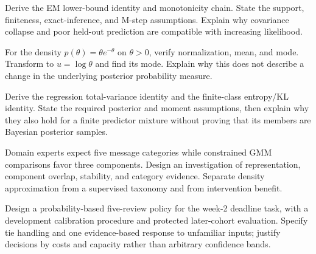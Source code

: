 \par\noindent\begin{minipage}{\linewidth}
\begin{challengeexercises}
\item {}Derive the EM lower-bound identity and monotonicity chain. State the support, finiteness, exact-inference, and M-step assumptions. Explain why covariance collapse and poor held-out prediction are compatible with increasing likelihood.
\item {}For the density $p(\theta)=\theta e^{-\theta}$ on $\theta>0$, verify normalization, mean, and mode. Transform to $u=\log\theta$ and find its mode. Explain why this does not describe a change in the underlying posterior probability measure.
\item {}Derive the regression total-variance identity and the finite-class entropy/KL identity. State the required posterior and moment assumptions, then explain why they also hold for a finite predictor mixture without proving that its members are Bayesian posterior samples.
\item {}Domain experts expect five message categories while constrained GMM comparisons favor three components. Design an investigation of representation, component overlap, stability, and category evidence. Separate density approximation from a supervised taxonomy and from intervention benefit.
\item {}Design a probability-based five-review policy for the week-2 deadline task, with a development calibration procedure and protected later-cohort evaluation. Specify tie handling and one evidence-based response to unfamiliar inputs; justify decisions by costs and capacity rather than arbitrary confidence bands.
\end{challengeexercises}
\end{minipage}
\clearpage
\begingroup\pagestyle{empty}\cleardoublepage\endgroup
\endgroup
